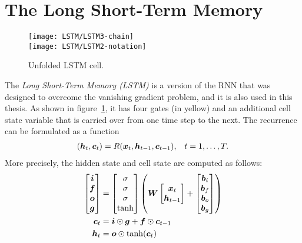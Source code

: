 	\section{The Long Short-Term Memory}
		\begin{figure}[tb]
			\centering
			\texttt{[image: LSTM/LSTM3-chain]}\\
			\vspace{5mm}
			\texttt{[image: LSTM/LSTM2-notation]}
			\caption[Unfolded LSTM cell]
					{Unfolded LSTM cell. 
					\imagecourtesycolah}
			\label{fig:LSTM3-chain}
		\end{figure}
		The \emph{Long Short-Term Memory (LSTM)} is a version of the RNN that was designed to overcome the vanishing gradient problem, and it is also used in this thesis.
		As shown in figure~\ref{fig:LSTM3-chain}, it has four gates (in yellow) and an additional cell state variable that is carried over from one time step to the next.
		The recurrence can be formulated as a function 
		\begin{align}\label{eq:LSTM_recurrence}
			(\bm{h}_t, \bm{c}_t) = R(\bm{x}_t, \bm{h}_{t-1}, \bm{c}_{t-1}), & & t = 1, \dots, T.
		\end{align}
		More precisely, the hidden state and cell state are computed as follows:
		\begin{align}\label{eq:Vanilla-LSTM-Definition}
			\begin{split}
				\begin{bmatrix}
					\bm{i} \\ 
					\bm{f} \\ 
					\bm{o} \\ 
					\bm{g}
				\end{bmatrix}
				&=
				\begin{bmatrix}
					\sigma \\ 
					\sigma \\ 
					\sigma \\ 
					\tanh
				\end{bmatrix}
				\left(
				\bm{W}
				\begin{bmatrix}
					\bm{x}_t \\
					\bm{h}_{t-1}
				\end{bmatrix}
				+
				\begin{bmatrix}
					\bm{b}_i \\ 
					\bm{b}_f \\ 
					\bm{b}_o \\ 
					\bm{b}_g
				\end{bmatrix}
				\right)
				\\
				\bm{c}_t &= \bm{i} \odot \bm{g} + \bm{f} \odot \bm{c}_{t-1} \\
				\bm{h}_t &= \bm{o} \odot \tanh(\bm{c}_{t})
			\end{split}
		\end{align}
